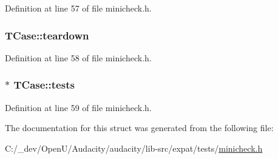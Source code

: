 Definition at line 57 of file minicheck.\+h.

\subsubsection[{\texorpdfstring{teardown}{teardown}}]{ T\+Case\+::teardown}\hypertarget{struct_t_case_ad4f1e0d9f95b5a4ea4edee3f5952da3e}{}\label{struct_t_case_ad4f1e0d9f95b5a4ea4edee3f5952da3e}


Definition at line 58 of file minicheck.\+h.

\subsubsection[{\texorpdfstring{tests}{tests}}]{$\ast$ T\+Case\+::tests}\hypertarget{struct_t_case_a002f38ddf6c5d8f3b6fe72cc1cc2384f}{}\label{struct_t_case_a002f38ddf6c5d8f3b6fe72cc1cc2384f}


Definition at line 59 of file minicheck.\+h.



The documentation for this struct was generated from the following file\+:\begin{DoxyCompactItemize}
\item 
C\+:/\+\_\+dev/\+Open\+U/\+Audacity/audacity/lib-\/src/expat/tests/\hyperlink{minicheck_8h}{minicheck.\+h}\end{DoxyCompactItemize}
